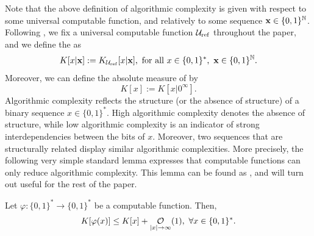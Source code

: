 Note that the above definition of algorithmic complexity is given with respect to some universal computable function, and relatively to some sequence ${\bf x} \in \{0,1\}^{\mathbb{N}}$. Following \cite[Definition 2.1.2]{li2008introduction}, we fix a universal computable function $\mathcal{U}_{\operatorname{ref}}$ throughout the paper, and we define the  as
\begin{equation}\label{eq:definition of relative algorithmic complexity}
	K[x|{\bf x}] := K_{\mathcal{U}_{\operatorname{ref}}}[x|{\bf x}], \ \text{for all} \ x \in \{0,1\}^\ast, \ {\bf x} \in \{0,1\}^{\mathbb{N}}.
\end{equation}
Moreover, we can define the absolute measure of  by
\begin{equation}
	K[x] := K[x | 0^\infty].
\end{equation}
Algorithmic complexity reflects the structure (or the absence of structure) of a binary sequence $x \in \{0,1\}^\ast$. High algorithmic complexity denotes the absence of structure, while low algorithmic complexity is an indicator of strong interdependencies between the bits of $x$. Moreover, two sequences that are structurally related display similar algorithmic complexities. More precisely, the following very simple standard lemma expresses that computable functions can only reduce algorithmic complexity. This lemma can be found as \cite[Exercise 2.1.6.a]{li2008introduction}, and will turn out useful for the rest of the paper.
\begin{lemma}\label{lem:computable functions decrease complexity}
	Let $\varphi : \{0,1\}^\ast \to \{0,1\}^\ast$ be a computable function. Then,
	\begin{equation}\label{eq:main:lem:computable functions decrease complexity}
		K[\varphi(x)] \leq K[x] + \bigOx[1]{|x|}, \ \forall x \in \{0,1\}^\ast.
	\end{equation}
\end{lemma}
